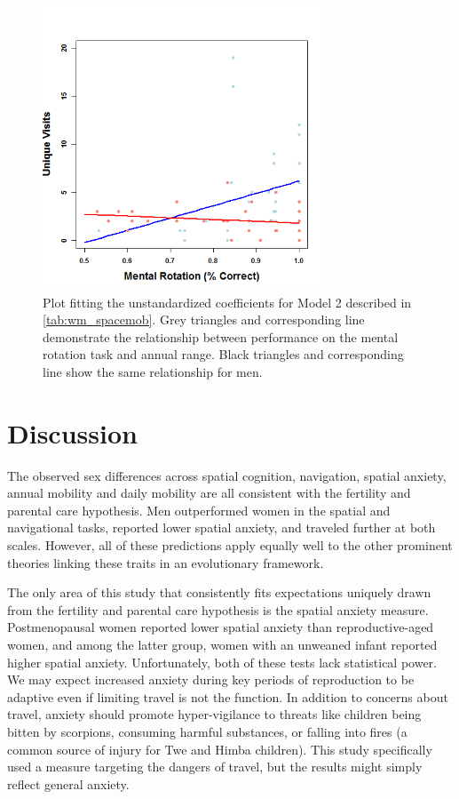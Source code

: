 \begin{figure}[!htb]
  \includegraphics[width=0.75\textwidth]{mw_acctot}
\caption{Plot fitting the unstandardized coefficients for Model 2 described in \ref{tab:wm_spacemob}. Grey triangles and corresponding line demonstrate the relationship between performance on the mental rotation task and annual range.  Black triangles and corresponding line show the same relationship for men.}
\label{fig:mw_acctot}       %
\end{figure}

\section{Discussion}
\label{sec:4}

The observed sex differences across spatial cognition, navigation, spatial anxiety, annual mobility and daily mobility are all consistent with the fertility and parental care hypothesis.  Men outperformed women in the spatial and navigational tasks, reported lower spatial anxiety, and traveled further at both scales.  However, all of these predictions apply equally well to the other prominent theories linking these traits in an evolutionary framework.  

The only area of this study that consistently fits expectations uniquely drawn from the fertility and parental care hypothesis is the spatial anxiety measure.  Postmenopausal women reported lower spatial anxiety than reproductive-aged women, and among the latter group, women with an unweaned infant reported higher spatial anxiety.  Unfortunately, both of these tests lack statistical power.  We may expect increased anxiety during key periods of reproduction to be adaptive even if limiting travel is not the function.  In addition to concerns about travel, anxiety should promote hyper-vigilance to threats like children being bitten by scorpions, consuming harmful substances, or falling into fires (a common source of injury for Twe and Himba children).  This study specifically used a measure targeting the dangers of travel, but the results might simply reflect general anxiety.

